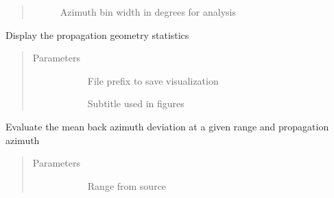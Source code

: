\documentclass[letterpaper,10pt,english]{sphinxmanual}
\begin{document}
\begin{fulllineitems}
\begin{fulllineitems}
\begin{quote}
\begin{description}
\begin{description}
\item[{}] \leavevmode
Azimuth bin width in degrees for analysis

\end{description}

\end{description}\end{quote}

\end{fulllineitems}


\begin{fulllineitems}
\label{\detokenize{stochprop.propagation:stochprop.propagation.PathGeometryModel.display}}
Display the propagation geometry statistics
\begin{quote}\begin{description}
\item[{Parameters}] \leavevmode\begin{description}
\item[{}] \leavevmode
File prefix to save visualization

\item[{}] \leavevmode
Subtitle used in figures

\end{description}

\end{description}\end{quote}

\end{fulllineitems}


\begin{fulllineitems}
\label{\detokenize{stochprop.propagation:stochprop.propagation.PathGeometryModel.eval_az_dev_mn}}
Evaluate the mean back azimuth deviation at a given range
and propagation azimuth
\begin{quote}\begin{description}
\item[{Parameters}] \leavevmode\begin{description}
\item[{}] \leavevmode
Range from source


\end{description}
\end{description}
\end{quote}
\end{fulllineitems}
\end{fulllineitems}
\end{document}
